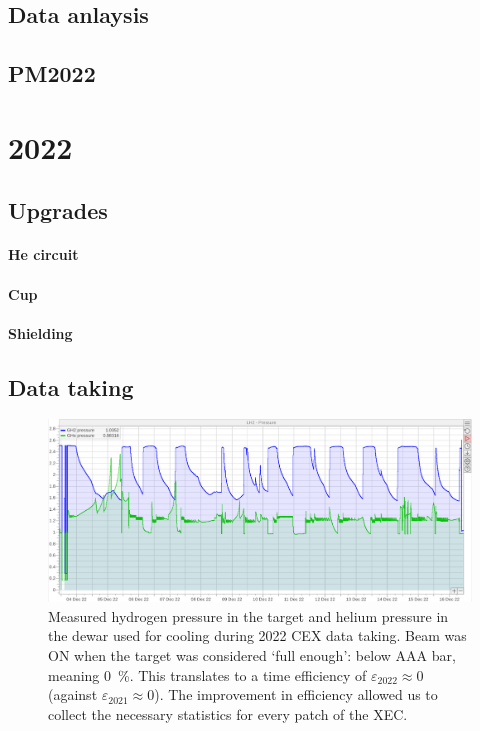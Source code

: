 \begin{refsection}
    \subsection{Data anlaysis}
    \subsection{PM2022}
\section{2022}
    \subsection{Upgrades}
        \paragraph{He circuit}
        \paragraph{Cup}
        \paragraph{Shielding}
        
    \subsection{Data taking}
        \begin{figure}
            \centering
            \includegraphics[width = \textwidth]{Figures/LH2/2022CEX_LH2.png}
            \caption{Measured hydrogen pressure in the target and helium pressure in the dewar used for cooling during 2022 CEX data taking. 
            Beam was ON when the target was considered `full enough': below AAA bar, meaning \SI{0}{\%}.  
            This translates to a time efficiency of $\varepsilon_{2022}\approx0$ (against $\varepsilon_{2021}\approx0$). 
            The improvement in efficiency allowed us to collect the necessary statistics for every patch of the XEC.}
            \label{fig:CEX2022}
        \end{figure}


\end{refsection}
